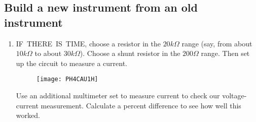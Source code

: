 \subsection{Build a new instrument from an old instrument}

\begin{enumerate}
\item IF\ THERE\ IS\ TIME, choose a resistor in the $20\unit{k\Omega}$ range (say, from about $10\unit{k\Omega}$ to about $30\unit{k\Omega}$). Choose a shunt resistor in the $200\unit{\Omega}$ range. Then set up the circuit to measure a current. 

\begin{figure}[h!]
	\centering
    \texttt{[image: PH4CAU1H]}
    \label{New Instrument and Test}
\end{figure}

Use an additional multimeter set to measure current to check our
voltage-current measurement. Calculate a percent difference to see how well
this worked.
\end{enumerate}


\vspace*{\fill}
\pagebreak